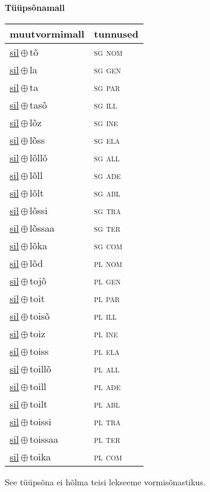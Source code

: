 

\vspace{3.5em}
\noindent \begin{minipage}{\textwidth}
\noindent \textbf{Tüüpsõnamall \,}\\

\begin{sideways}
\begin{tabular}{l l}
muutvormimall & tunnused \\
\hline
\underline{sil}\,$\oplus$\,tõ & \textsc{ sg nom } \\
\underline{sil}\,$\oplus$\,la & \textsc{ sg gen } \\
\underline{sil}\,$\oplus$\,ta & \textsc{ sg par } \\
\underline{sil}\,$\oplus$\,tasõ & \textsc{ sg ill } \\
\underline{sil}\,$\oplus$\,lõz & \textsc{ sg ine } \\
\underline{sil}\,$\oplus$\,lõss & \textsc{ sg ela } \\
\underline{sil}\,$\oplus$\,lõllõ & \textsc{ sg all } \\
\underline{sil}\,$\oplus$\,lõll & \textsc{ sg ade } \\
\underline{sil}\,$\oplus$\,lõlt & \textsc{ sg abl } \\
\underline{sil}\,$\oplus$\,lõssi & \textsc{ sg tra } \\
\underline{sil}\,$\oplus$\,lõssaa & \textsc{ sg ter } \\
\underline{sil}\,$\oplus$\,lõka & \textsc{ sg com } \\
\underline{sil}\,$\oplus$\,lõd & \textsc{ pl nom } \\
\underline{sil}\,$\oplus$\,tojõ & \textsc{ pl gen } \\
\underline{sil}\,$\oplus$\,toit & \textsc{ pl par } \\
\underline{sil}\,$\oplus$\,toisõ & \textsc{ pl ill } \\
\underline{sil}\,$\oplus$\,toiz & \textsc{ pl ine } \\
\underline{sil}\,$\oplus$\,toiss & \textsc{ pl ela } \\
\underline{sil}\,$\oplus$\,toillõ & \textsc{ pl all } \\
\underline{sil}\,$\oplus$\,toill & \textsc{ pl ade } \\
\underline{sil}\,$\oplus$\,toilt & \textsc{ pl abl } \\
\underline{sil}\,$\oplus$\,toissi & \textsc{ pl tra } \\
\underline{sil}\,$\oplus$\,toissaa & \textsc{ pl ter } \\
\underline{sil}\,$\oplus$\,toika & \textsc{ pl com } \\
\end{tabular}
\end{sideways}
\label{tab:tüüpsõnamall-siltõ}

\end{minipage}

 
\vspace{1em}
\noindent See tüüpsõna ei hõlma teisi lekseeme vormi\-sõnastikus.
